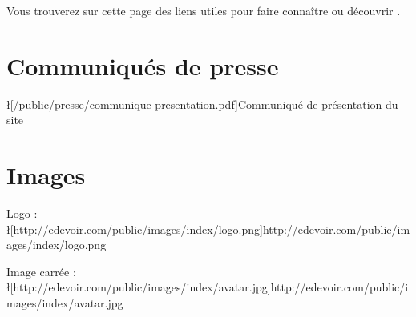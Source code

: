 Vous trouverez sur cette page des liens utiles pour faire connaître ou découvrir \eDevoir.

\section{Communiqués de presse}
\item \l[/public/presse/communique-presentation.pdf]{Communiqué de présentation du site}

\section{Images}
\item Logo : \l[http://edevoir.com/public/images/index/logo.png]{http://edevoir.com/public/images/index/logo.png}
\item Image carrée : \l[http://edevoir.com/public/images/index/avatar.jpg]{http://edevoir.com/public/images/index/avatar.jpg}